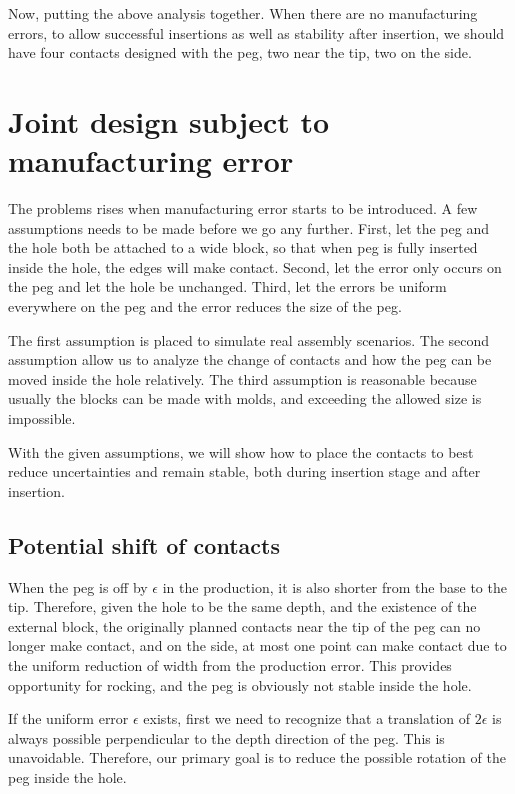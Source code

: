 \documentclass[11pt, twocolumn]{article}
\begin{document}
Now, putting the above analysis together. When there are no manufacturing errors, to allow successful insertions as well as stability after insertion, we should have four contacts designed with the peg, two near the tip, two on the side. 


\section{Joint design subject to manufacturing error}
\label{sec:with_errors}


The problems rises when manufacturing error starts to be introduced. A few assumptions needs to be made before we go any further. First, let the peg and the hole both be attached to a wide block, so that when peg is fully inserted inside the hole, the edges will make contact. Second, let the error only occurs on the peg and let the hole be unchanged. Third, let the errors be uniform everywhere on the peg and the error reduces the size of the peg. 

The first assumption is placed to simulate real assembly scenarios. The second assumption allow us to analyze the change of contacts and how the peg can be moved inside the hole relatively. The third assumption is reasonable because usually the blocks can be made with molds, and exceeding the allowed size is impossible. 

With the given assumptions, we will show how to place the contacts to best reduce uncertainties and remain stable, both during insertion stage and after insertion. 


\subsection{Potential shift of contacts}

When the peg is off by $\epsilon$ in the production, it is also shorter from the base to the tip. Therefore, given the hole to be the same depth, and the existence of the external block, the originally planned contacts near the tip of the peg can no longer make contact, and on the side, at most one point can make contact due to the uniform reduction of width from the production error. This provides opportunity for rocking, and the peg is obviously not stable inside the hole. 

If the uniform error $\epsilon$ exists, first we need to recognize that a translation of $2\epsilon$ is always possible perpendicular to the depth direction of the peg. This is unavoidable. Therefore, our primary goal is to reduce the possible rotation of the peg inside the hole. 
\end{document}
